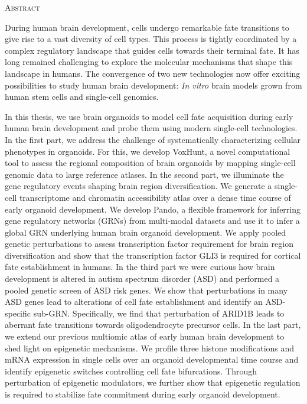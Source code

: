 \begin{center}
    \large\textsc{Abstract}
\end{center}

During human brain development, cells undergo remarkable fate transitions to give rise to a vast diversity of cell types. This process is tightly coordinated by a complex regulatory landscape that guides cells towards their terminal fate. It has long remained challenging to explore the molecular mechanisms that shape this landscape in humans. The convergence of two new technologies now offer exciting possibilities to study human brain development: \textit{In vitro} brain models grown from human stem cells and single-cell genomics. 

In this thesis, we use brain organoids to model cell fate acquisition during early human brain development and probe them using modern single-cell technologies. In the first part, we address the challenge of systematically characterizing cellular  phenotypes in organoids. For this, we develop VoxHunt, a novel computational tool to assess the regional composition of brain organoids by mapping single-cell genomic data to large reference atlases. In the second part, we illuminate the gene regulatory events shaping brain region diversification. We generate a single-cell transcriptome and chromatin accessibility atlas over a dense time course of early organoid development. We develop Pando, a flexible framework for inferring gene regulatory networks (GRNs) from multi-modal datasets and use it to infer a global GRN underlying human brain organoid development. We apply pooled genetic perturbations to assess transcription factor requirement for brain region diversification and show that the transcription factor GLI3 is required for cortical fate establishment in humans. In the third part we were curious how brain development is altered in autism spectrum disorder (ASD) and performed a pooled genetic screen of ASD risk genes. We show that perturbations in many ASD genes lead to alterations of cell fate establishment and identify an ASD-specific sub-GRN. Specifically, we find that perturbation of ARID1B leads to aberrant fate transitions towards oligodendrocyte precursor cells. In the last part, we extend our previous multiomic atlas of early human brain development to shed light on epigenetic mechanisms. We profile three histone modifications and mRNA expression in single cells over an organoid developmental time course and identify epigenetic switches controlling cell fate bifurcations. Through perturbation of epigenetic modulators, we further show that epigenetic regulation is required to stabilize fate commitment during early organoid development. 


